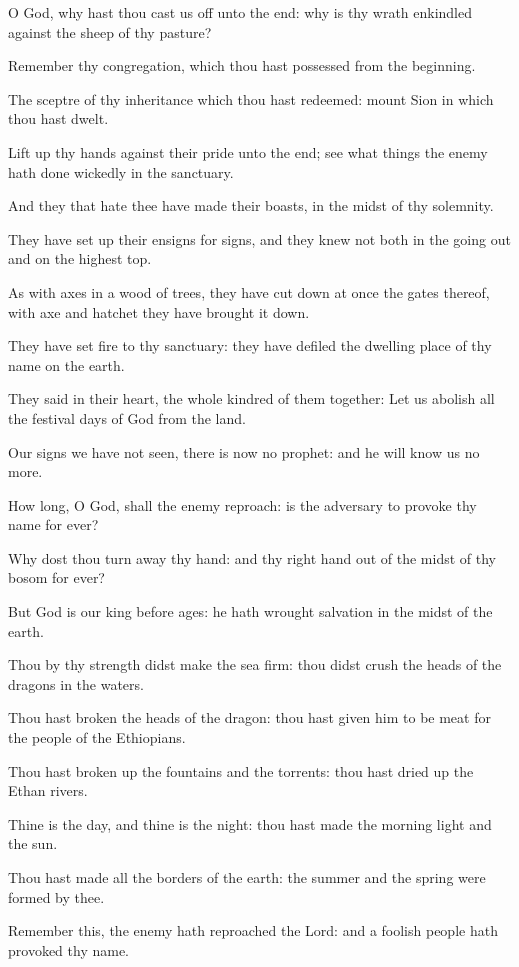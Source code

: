 ﻿\item O God, why hast thou cast us off unto the end: why is thy wrath enkindled against the sheep of thy pasture?
\item Remember thy congregation, which thou hast possessed from the beginning.
\item The sceptre of thy inheritance which thou hast redeemed: mount Sion in which thou hast dwelt.
\item Lift up thy hands against their pride unto the end; see what things the enemy hath done wickedly in the sanctuary.
\item And they that hate thee have made their boasts, in the midst of thy solemnity.
\item They have set up their ensigns for signs, and they knew not both in the going out and on the highest top.
\item As with axes in a wood of trees, they have cut down at once the gates thereof, with axe and hatchet they have brought it down.
\item They have set fire to thy sanctuary: they have defiled the dwelling place of thy name on the earth.
\item They said in their heart, the whole kindred of them together: Let us abolish all the festival days of God from the land.
\item Our signs we have not seen, there is now no prophet: and he will know us no more.
\item How long, O God, shall the enemy reproach: is the adversary to provoke thy name for ever?
\item Why dost thou turn away thy hand: and thy right hand out of the midst of thy bosom for ever?
\item But God is our king before ages: he hath wrought salvation in the midst of the earth.
\item Thou by thy strength didst make the sea firm: thou didst crush the heads of the dragons in the waters.
\item Thou hast broken the heads of the dragon: thou hast given him to be meat for the people of the Ethiopians.
\item Thou hast broken up the fountains and the torrents: thou hast dried up the Ethan rivers.
\item Thine is the day, and thine is the night: thou hast made the morning light and the sun.
\item Thou hast made all the borders of the earth: the summer and the spring were formed by thee.
\item Remember this, the enemy hath reproached the Lord: and a foolish people hath provoked thy name.

